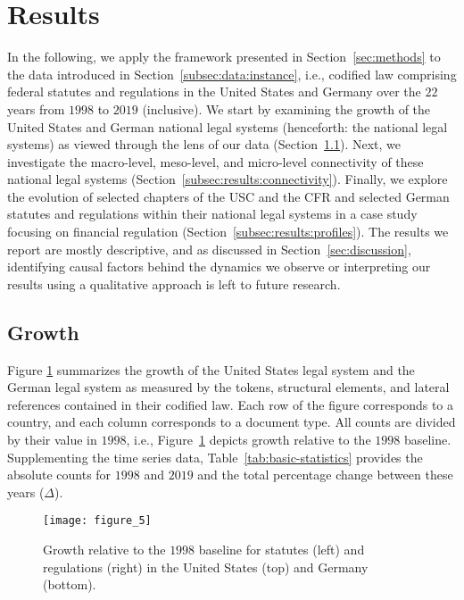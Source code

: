 \section{Results}
\label{sec:results}

In the following, we apply the framework presented in Section~\ref{sec:methods} to the data introduced in Section~\ref{subsec:data:instance}, i.e., codified law comprising federal statutes and regulations in the United States and Germany over the $22$ years from $1998$ to $2019$ (inclusive).
We start by examining the growth of the United States and German national legal systems (henceforth: the national legal systems) as viewed through the lens of our data (Section~\ref{subsec:results:growth}).
Next, we investigate the macro-level, meso-level, and micro-level connectivity of these national legal systems (Section~\ref{subsec:results:connectivity}).
Finally, we explore the evolution of selected chapters of the USC and the CFR and selected German statutes and regulations within their national legal systems in a case study focusing on financial regulation (Section~\ref{subsec:results:profiles}).
The results we report are mostly descriptive, and as discussed in Section~\ref{sec:discussion}, identifying causal factors behind the dynamics we observe or interpreting our results using a qualitative approach is left to future research.

\vspace*{30pt}
\subsection{Growth}
\label{subsec:results:growth}

Figure \ref{fig:basic-statistics} summarizes the growth of the United States legal system and the German legal system as measured by the tokens, structural elements, and lateral references contained in their codified law. 
Each row of the figure corresponds to a country, and each column corresponds to a document type. 
All counts are divided by their value in $1998$, i.e., Figure~\ref{fig:basic-statistics} depicts growth relative to the $1998$ baseline.
Supplementing the time series data, 
Table~\ref{tab:basic-statistics} provides the absolute counts for $1998$ and $2019$ and the total percentage change between these years ($\Delta$).

\begin{figure}
	\centering
	\texttt{[image: figure\_5]}
	\caption{Growth relative to the $1998$ baseline for statutes (left) and regulations (right) in the United States (top) and Germany (bottom).}\label{fig:basic-statistics}
\end{figure}

